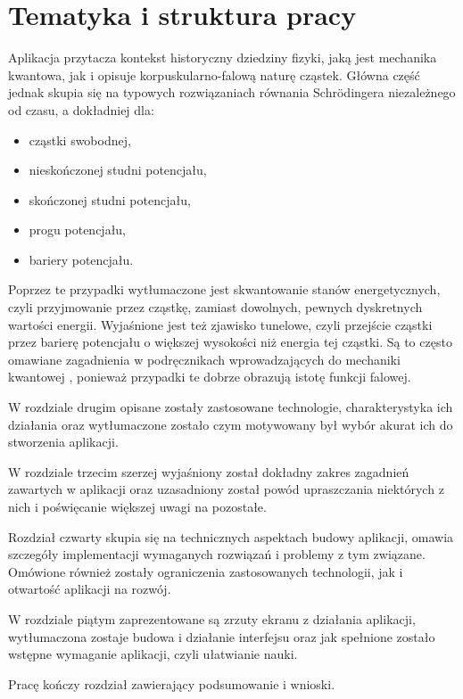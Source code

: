 \documentclass{SGGW-thesis}
\begin{document}
	\section{Tematyka i struktura pracy}
	Aplikacja przytacza kontekst historyczny dziedziny fizyki, jaką jest mechanika kwantowa, jak i opisuje korpuskularno-falową naturę cząstek. Główna część jednak skupia się na typowych rozwiązaniach równania Schrödingera niezależnego od czasu, a dokładniej dla:
	\begin{itemize}
	\item cząstki swobodnej,
	\item nieskończonej studni potencjału,
	\item skończonej studni potencjału,
	\item progu potencjału,
	\item bariery potencjału.
	\end{itemize}
	
	Poprzez te przypadki wytłumaczone jest skwantowanie stanów energetycznych, czyli przyjmowanie przez cząstkę, zamiast dowolnych, pewnych dyskretnych wartości energii. Wyjaśnione jest też zjawisko tunelowe, czyli przejście cząstki przez barierę potencjału o większej wysokości niż energia tej cząstki. Są to często omawiane zagadnienia w podręcznikach wprowadzających do mechaniki kwantowej \cite{fiz atom} \cite{mechanika kwant} \cite{fiz kwant}, ponieważ przypadki te dobrze obrazują istotę funkcji falowej.
	
	W rozdziale drugim opisane zostały zastosowane technologie, charakterystyka ich działania oraz wytłumaczone zostało czym motywowany był wybór akurat ich do stworzenia aplikacji.
	
	W rozdziale trzecim szerzej wyjaśniony został dokładny zakres zagadnień zawartych w aplikacji oraz uzasadniony został powód upraszczania niektórych z nich i poświęcanie większej uwagi na pozostałe.
	
	Rozdział czwarty skupia się na technicznych aspektach budowy aplikacji, omawia szczegóły implementacji wymaganych rozwiązań i problemy z tym związane. Omówione również zostały ograniczenia zastosowanych technologii, jak i otwartość aplikacji na rozwój.
	
	W rozdziale piątym zaprezentowane są zrzuty ekranu z działania aplikacji, wytłumaczona zostaje budowa i działanie interfejsu oraz jak spełnione zostało wstępne wymaganie aplikacji, czyli ułatwianie nauki.
	
	Pracę kończy rozdział zawierający podsumowanie i wnioski.
	
\end{document}

